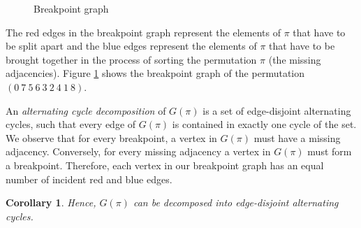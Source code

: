 \documentclass[11pt,DIV=11]{scrartcl}
\newtheorem{corollary}{Corollary}[theorem]
\theoremstyle{definition}
\theoremstyle{remark}
\begin{document}
\begin{figure}
    \centering
    \caption{Breakpoint graph}
    \label{fig:breakpoint_graph}
\end{figure}

The red edges in the breakpoint graph represent the elements of $\pi$ that have to be split apart and the blue edges represent the elements of $\pi$ that have to be brought together in the process of sorting the permutation $\pi$ (the missing adjacencies). Figure \ref{fig:breakpoint_graph} shows the breakpoint graph of the permutation $(0\ 7\ 5\ 6\ 3\ 2\ 4\ 1\ 8)$.

An \textit{alternating cycle decomposition} of $G(\pi)$ is a set of edge-disjoint alternating cycles, such that every edge of $G(\pi)$ is contained in exactly one cycle of the set. We observe that for every breakpoint, a vertex in $G(\pi)$ must have a missing adjacency. Conversely, for every missing adjacency a vertex in $G(\pi)$ must form a breakpoint. Therefore, each vertex in our breakpoint graph has an equal number of incident red and blue edges.

\begin{corollary}
Hence, $G(\pi)$ can be decomposed into edge-disjoint alternating cycles.
\end{corollary}
\end{document}
